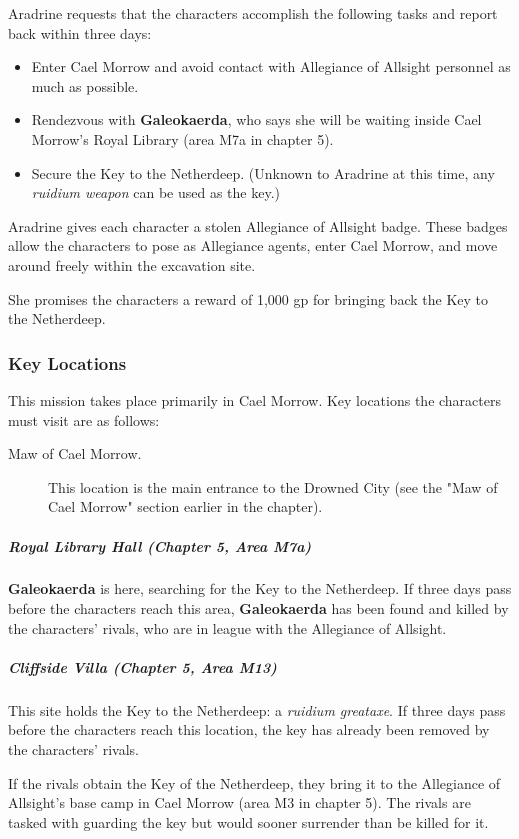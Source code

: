 \documentclass[10pt,a4paper,twoside,fancy,bg=print,twocolumn,openany,nodeprecatedcode]{dndbook}
\begin{document}
Aradrine requests that the characters accomplish the following tasks and report back within three days:


\begin{itemize}
\item Enter Cael Morrow and avoid contact with Allegiance of Allsight personnel as much as possible.
\item Rendezvous with \textbf{Galeokaerda}, who says she will be waiting inside Cael Morrow's Royal Library (area M7a in chapter 5).
\item Secure the Key to the Netherdeep. (Unknown to Aradrine at this time, any \textit{ruidium weapon} can be used as the key.)
\end{itemize}

Aradrine gives each character a stolen Allegiance of Allsight badge. These badges allow the characters to pose as Allegiance agents, enter Cael Morrow, and move around freely within the excavation site.

She promises the characters a reward of 1,000 gp for bringing back the Key to the Netherdeep.

\subsubsection{Key Locations}
This mission takes place primarily in Cael Morrow. Key locations the characters must visit are as follows:


\begin{description}
\item[Maw of Cael Morrow.]
This location is the main entrance to the Drowned City (see the "Maw of Cael Morrow" section earlier in the chapter).
\end{description}

\subparagraph{Royal Library Hall (Chapter 5, Area M7a)}
\textbf{Galeokaerda} is here, searching for the Key to the Netherdeep. If three days pass before the characters reach this area, \textbf{Galeokaerda} has been found and killed by the characters' rivals, who are in league with the Allegiance of Allsight.

\subparagraph{Cliffside Villa (Chapter 5, Area M13)}
This site holds the Key to the Netherdeep: a \textit{ruidium greataxe}. If three days pass before the characters reach this location, the key has already been removed by the characters' rivals.

If the rivals obtain the Key of the Netherdeep, they bring it to the Allegiance of Allsight's base camp in Cael Morrow (area M3 in chapter 5). The rivals are tasked with guarding the key but would sooner surrender than be killed for it.
\end{document}

